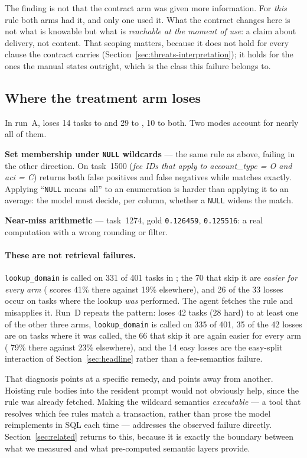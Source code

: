 The finding is not that the contract arm was given more information. For
\emph{this} rule both arms had it, and only one used it. What the contract
changes here is not what is knowable but what is \emph{reachable at the moment
of use}: a claim about delivery, not content. That scoping matters, because it
does not hold for every clause the contract carries
(Section~\ref{sec:threats-interpretation}); it holds for the ones the manual
states outright, which is the class this failure belongs to.

\subsection{Where the treatment arm loses}

In run~A, \armC{} loses 14 tasks to \armS{} and 29 to \armM{}, 10 to both. Two
modes account for nearly all of them.

\textbf{Set membership under \texttt{NULL} wildcards} --- the same rule as
above, failing in the other direction. On task~1500 (\emph{fee IDs that apply
to account\_type = O and aci = C}) \armC{} returns both false positives and
false negatives while \armM{} matches exactly. Applying ``\texttt{NULL} means
all'' to an enumeration is harder than applying it to an average: the model
must decide, per column, whether a \texttt{NULL} widens the match.

\textbf{Near-miss arithmetic} --- task~1274, gold \texttt{0.126459}, \armC{}
\texttt{0.125516}: a real computation with a wrong rounding or filter.

\paragraph{These are not retrieval failures.} \texttt{lookup\_domain} is called
on 331 of 401 tasks in \armC{}; the 70 that skip it are \emph{easier for every
arm} (\armS{} scores 41\% there against 19\% elsewhere), and 26 of the 33
losses occur on tasks where the lookup \emph{was} performed. The agent fetches
the rule and misapplies it. Run~D repeats the pattern: \armC{} loses 42 tasks
(28 hard) to at least one of the other three arms, \texttt{lookup\_domain} is
called on 335 of 401, 35 of the 42
losses are on tasks where it was called, the 66 that skip it are again easier
for every arm (\armS{} 79\% there against 23\% elsewhere), and the 14 easy
losses are the easy-split interaction of Section~\ref{sec:headline} rather
than a fee-semantics failure.

That diagnosis points at a specific remedy, and points away from another.
Hoisting rule bodies into the resident prompt would not obviously help, since
the rule was already fetched. Making the wildcard semantics \emph{executable}
--- a tool that resolves which fee rules match a transaction, rather than prose
the model reimplements in SQL each time --- addresses the observed failure
directly. Section~\ref{sec:related} returns to this, because it is exactly the
boundary between what we measured and what pre-computed semantic layers
provide.

